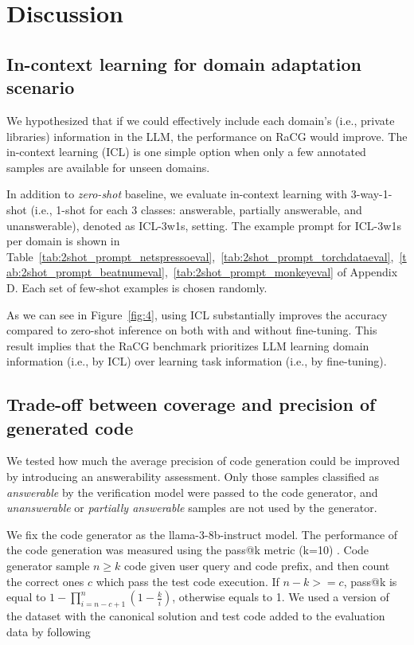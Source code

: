 \section{Discussion}



\subsection{In-context learning for domain adaptation scenario}
We hypothesized that if we could effectively include each domain's (i.e., private libraries) information in the LLM, the performance on RaCG would improve. The in-context learning (ICL) is one simple option when only a few annotated samples are available for unseen domains. 

In addition to \textit{zero-shot} baseline, we evaluate in-context learning with 3-way-1-shot (i.e., 1-shot for each 3 classes: answerable, partially answerable, and unanswerable), denoted as ICL-3w1s, setting. The example prompt for ICL-3w1s per domain is shown in Table~\ref{tab:2shot_prompt_netspressoeval},~\ref{tab:2shot_prompt_torchdataeval},~\ref{tab:2shot_prompt_beatnumeval},~\ref{tab:2shot_prompt_monkeyeval} of Appendix D. Each set of few-shot examples is chosen randomly. 

As we can see in Figure~\ref{fig:4}, using ICL substantially improves the accuracy compared to zero-shot inference on both with and without fine-tuning. This result implies that the RaCG benchmark prioritizes LLM learning domain information (i.e., by ICL) over learning task information (i.e., by fine-tuning).



\subsection{Trade-off between coverage and precision of generated code}
We tested how much the average precision of code generation could be improved by introducing an answerability assessment. Only those samples classified as \textit{answerable} by the verification model were passed to the code generator, and \textit{unanswerable} or \textit{partially answerable} samples are not used by the generator.

We fix the code generator as the llama-3-8b-instruct model. The performance of the code generation was measured using the pass@k metric (k=10) \cite{chen2021humaneval}. Code generator sample \( n \geq k \) code given user query and code prefix, and then count the correct ones $c$ which pass the test code execution. If $n-k>=c$, pass@k is equal to $1-\prod\nolimits_{i=n-c+1}^{n} (1-\frac{k}{i})$, otherwise equals to 1. We used a version of the dataset with the canonical solution and test code added to the evaluation data by following \cite{zan-etal-2022-language}

